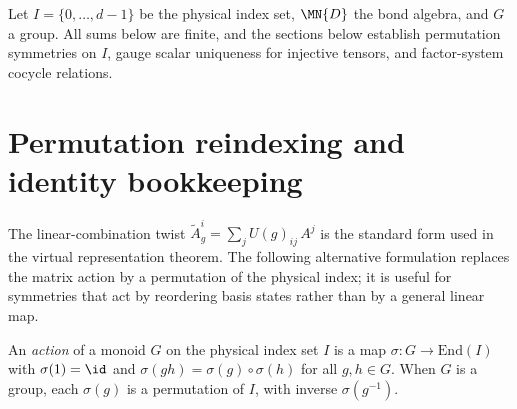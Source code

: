 Let $I=\{0,\ldots,d-1\}$ be the physical index set, $\MN{D}$ the bond algebra,
and $G$ a group. All sums below are finite, and the sections below establish
permutation symmetries on $I$, gauge scalar uniqueness for injective tensors,
and factor-system cocycle relations.

\section{Permutation reindexing and identity bookkeeping}
\label{sec:app_symmetry_permutations}

The linear-combination twist $\widetilde{A}_g^i = \sum_j U(g)_{ij}\, A^j$
is the standard form used in the virtual representation theorem.
The following alternative formulation replaces the matrix action by a
permutation of the physical index; it is useful for symmetries that act by
reordering basis states rather than by a general linear map. %

\begin{definition}\label{def:on_site_symmetry_perm}
    \mathlibok %
    An \emph{action} of a monoid $G$ on the physical index set $I$ is a map
    $\sigma : G \to \mathrm{End}(I)$ with $\sigma(1) = \id$ and
    $\sigma(gh) = \sigma(g) \circ \sigma(h)$ for all $g, h \in G$. When $G$
    is a group, each $\sigma(g)$ is a permutation of $I$, with inverse
    $\sigma(g^{-1})$.
\end{definition}

